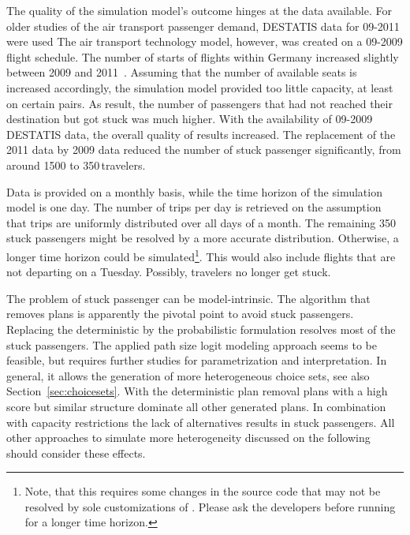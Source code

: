 The quality of the simulation model's outcome hinges at the data available.  
For older studies of the air transport passenger demand, DESTATIS data for 09-2011 were used 
The air transport technology model, however, was created on a 09-2009 flight schedule.  
The number of starts of flights within Germany increased slightly between 2009 and 2011~\citep[][p.~23]{DLR2011Luftverkehrsbericht}. 
Assuming that the number of available seats is increased accordingly, the simulation model provided too little capacity, at least on certain  pairs. 
As result, the number of passengers that had not reached their destination but got stuck was much higher.  
With the availability of 09-2009 DESTATIS data, the overall quality of results increased.  
The replacement of the 2011 data by 2009 data reduced the number of stuck passenger significantly, from around 1500 to 350\,travelers. 

Data is provided on a monthly basis, while the time horizon of the simulation model is one day. 
The number of trips per day is retrieved on the assumption that trips are uniformly distributed over all days of a month.  
The remaining 350\,stuck passengers might be resolved by a more accurate distribution. 
Otherwise, a longer time horizon could be simulated\footnote{Note, that this requires some changes in the source code that may not be resolved by sole customizations of . Please ask the developers before running  for a longer time horizon.}. 
This would also include flights that are not departing on a Tuesday. 
Possibly, travelers no longer get stuck. 

The problem of stuck passenger can be model-intrinsic. 
The algorithm that removes plans is apparently the pivotal point to avoid stuck passengers. 
Replacing the deterministic by the probabilistic formulation resolves most of the stuck passengers. 
The applied path size logit modeling approach seems to be feasible, but requires further studies for parametrization and interpretation. 
In general, it allows the generation of more heterogeneous choice sets, see also Section~\ref{sec:choicesets}. 
With the deterministic plan removal plans with a high score but similar structure dominate all other generated plans. 
In combination with capacity restrictions the lack of alternatives results in stuck passengers.  
All other approaches to simulate more heterogeneity discussed on the following should consider these effects.  

